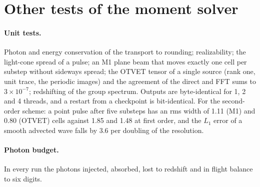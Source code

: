 \documentclass[11pt]{article}
\begin{document}
\section{Other tests of the moment solver}\label{sec:other}

\paragraph{Unit tests.} Photon and energy conservation of the transport to rounding; realizability; the
light-cone spread of a pulse; an M1 plane beam that moves exactly one cell per substep without sideways spread;
the OTVET tensor of a single source (rank one, unit trace, the periodic images) and the agreement of the
direct and FFT sums to $3\times10^{-7}$; redshifting of the group spectrum. Outputs are byte-identical for
1, 2 and 4 threads, and a restart from a checkpoint is bit-identical. For the second-order scheme: a point
pulse after five substeps has an rms width of 1.11 (M1) and 0.80 (OTVET) cells against 1.85 and 1.48 at first
order, and the $L_1$ error of a smooth advected wave falls by 3.6 per doubling of the resolution.

\paragraph{Photon budget.} In every run the photons injected, absorbed, lost to redshift and in flight
balance to six digits.
\end{document}

